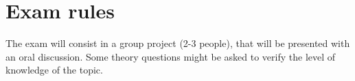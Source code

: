 \section*{Exam rules}

The exam will consist in a group project (2-3 people), that will be presented with an oral discussion. Some theory questions might be asked to verify the level of knowledge of the topic.
